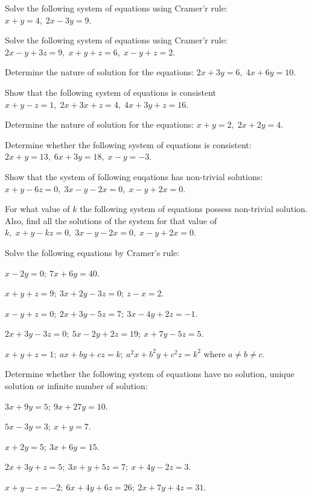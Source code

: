 \item Solve the following system of equations using Cramer'r rule: $x + y = 4,\;2x - 3y = 9$.
\item Solve the following system of equations using Cramer'r rule: $2x - y + 3z = 9,\;x + y + z = 6,\;x - y + z = 2$.
\item Determine the nature of solution for the equations: $2x + 3y = 6,\;4x + 6y = 10$.
\item Show that the following system of equations is consistent $x + y - z = 1,\;2x + 3x + z = 4,\;4x + 3y + z = 16$.
\item Determine the nature of solution for the equations: $x + y = 2,\;2x + 2y = 4$.
\item Determine whether the following system of equations is consistent: $2x + y = 13,\;6x + 3y = 18,\;x - y = -3$.
\item Show that the system of following euqations has non-trivial solutions: $x + y - 6z = 0,\;3x - y - 2x = 0,\;x - y + 2x = 0$.
\item For what value of $k$ the following system of equations possess non-trivial solution. Also, find all the solutions of the
  system for that value of $k,\;x + y - kz = 0,\;3x - y - 2x = 0,\;x - y + 2x = 0$.
\stopitemize

Solve the following equations by Cramer's rule:

\item $x - 2y = 0;\ 7x + 6y = 40$.
\item $x + y + z = 9;\ 3x + 2y - 3z = 0;\ z - x = 2$.
\item $x - y + z = 0;\ 2x + 3y - 5z = 7;\ 3x - 4y + 2z = -1$.
\item $2x + 3y - 3z = 0;\ 5x - 2y + 2z = 19;\ x + 7y - 5z = 5$.
\item $x + y + z = 1;\ ax + by + cz = k;\ a^2x + b^2y + c^2z = k^2$ where $a\neq b\neq c$.
\stopitemize

Determine whether the following system of equations have no solution, unique solution or infinite number of solution:

\item $3x + 9y = 5;\ 9x + 27y = 10$.
\item $5x - 3y = 3;\ x + y = 7$.
\item $x + 2y = 5;\ 3x + 6y = 15$.
\item $2x + 3y + z = 5;\ 3x + y + 5z = 7;\ x + 4y - 2z = 3$.
\item $x + y - z = -2;\ 6x + 4y + 6z = 26;\ 2x + 7y + 4z = 31$.
\stopitemize

